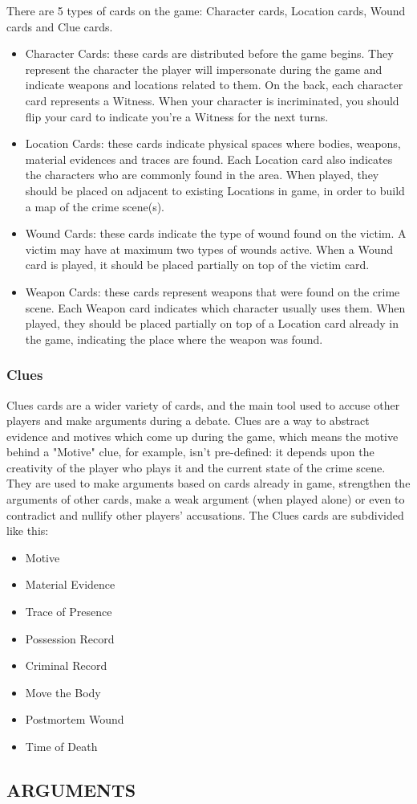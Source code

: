 \documentclass[a4paper, 11pt]{article}
\begin{document}

	There are 5 types of cards on the game: Character cards, Location cards, Wound cards and Clue cards.


	\begin{itemize}
		\item Character Cards: these cards are distributed before the game begins. They represent the character the player will impersonate during the game and indicate weapons and locations related to them. On the back, each character card represents a Witness. When your character is incriminated, you should flip your card to indicate you're a Witness for the next turns.

		\item Location Cards: these cards indicate physical spaces where bodies, weapons, material evidences and traces are found. Each Location card also indicates the characters who are commonly found in the area. When played, they should be placed on adjacent to existing Locations in game, in order to build a map of the crime scene(s).

		\item Wound Cards: these cards indicate the type of wound found on the victim. A victim may have at maximum two types of wounds active. When a Wound card is played, it should be placed partially on top of the victim card.

		\item Weapon Cards: these cards represent weapons that were found on the crime scene. Each Weapon card indicates which character usually uses them. When played, they should be placed partially on top of a Location card already in the game, indicating the place where the weapon was found.
	\end{itemize}

	\subsubsection*{Clues}

		Clues cards are a wider variety of cards, and the main tool used to accuse other players and make arguments during a debate. Clues are a way to abstract evidence and motives which come up during the game, which means the motive behind a "Motive" clue, for example, isn't pre-defined: it depends upon the creativity of the player who plays it and the current state of the crime scene. They are used to make arguments based on cards already in game, strengthen the arguments of other cards, make a weak argument (when played alone) or even to contradict and nullify other players' accusations. The Clues cards are subdivided like this:

		\begin{itemize}
			\item Motive
			\item Material Evidence
			\item Trace of Presence
			\item Possession Record
			\item Criminal Record
			\item Move the Body
			\item Postmortem Wound
			\item Time of Death
		\end{itemize}

\subsection*{ARGUMENTS}
\end{document}

